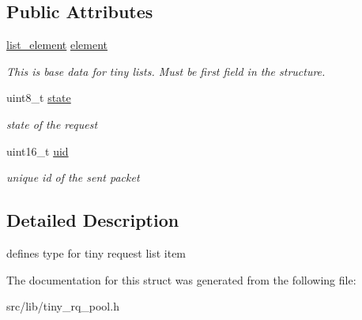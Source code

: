 \subsection*{Public Attributes}
\begin{DoxyCompactItemize}
\item 
\hypertarget{structtiny__request___a02c8fb6d26d0cfb0264423a1cb643159}{}\hyperlink{structlist__element__}{list\+\_\+element} \hyperlink{structtiny__request___a02c8fb6d26d0cfb0264423a1cb643159}{element}\label{structtiny__request___a02c8fb6d26d0cfb0264423a1cb643159}

\begin{DoxyCompactList}\small\item\em This is base data for tiny lists. Must be first field in the structure. \end{DoxyCompactList}\item 
\hypertarget{structtiny__request___a019207b55569a48a82a2922dd3cc7eb2}{}uint8\+\_\+t \hyperlink{structtiny__request___a019207b55569a48a82a2922dd3cc7eb2}{state}\label{structtiny__request___a019207b55569a48a82a2922dd3cc7eb2}

\begin{DoxyCompactList}\small\item\em state of the request \end{DoxyCompactList}\item 
\hypertarget{structtiny__request___aefa85d07e09d6772963532b6cf1ed125}{}uint16\+\_\+t \hyperlink{structtiny__request___aefa85d07e09d6772963532b6cf1ed125}{uid}\label{structtiny__request___aefa85d07e09d6772963532b6cf1ed125}

\begin{DoxyCompactList}\small\item\em unique id of the sent packet \end{DoxyCompactList}\end{DoxyCompactItemize}


\subsection{Detailed Description}
defines type for tiny request list item 

The documentation for this struct was generated from the following file\+:\begin{DoxyCompactItemize}
\item 
src/lib/tiny\+\_\+rq\+\_\+pool.\+h\end{DoxyCompactItemize}
